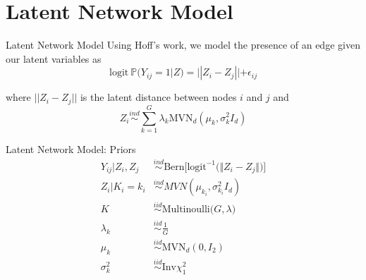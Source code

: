 \documentclass[handout]{beamer}
\begin{document}
%
%

\section{Latent Network Model}
\begin{frame}{Latent Network Model}
Using Hoff's work, we model the presence of an edge given our latent variables as
\[\text{logit} \ \mathbb{P}(Y_{ij} = 1|Z) = ||Z_i - Z_j|| + \epsilon_{ij}\]

where $||Z_i - Z_j||$ is the latent distance between nodes $i$ and $j$ and 
\[Z_i \overset{ind}{\sim}\sum_{k=1}^G \lambda_k\text{MVN}_d(\mu_k,\sigma_k^2I_d)\]

\end{frame}

\begin{frame}{Latent Network Model: Priors}
\begin{align*}
Y_{ij} | Z_i, Z_j &\overset{ind}\sim \text{Bern}\Big[\text{logit}^{-1}\big(\Vert Z_i - Z_j \Vert\big)\Big] \\
Z_i | K_i = k_i &\overset{ind}\sim MVN(\mu_{k_i}, \sigma_{k_i}^2 I_d) \\
K &\overset{iid}\sim \text{Multinoulli}\big(G, \lambda \big) \\
\lambda_k &\overset{iid}\sim \frac{1}{G} \\
\mu_k &\overset{iid}\sim \text{MVN}_d(0, I_2) \\
\sigma_k^2 &\overset{iid}\sim \text{Inv} \chi^2_1
\end{align*}
\end{frame}
\end{document}
